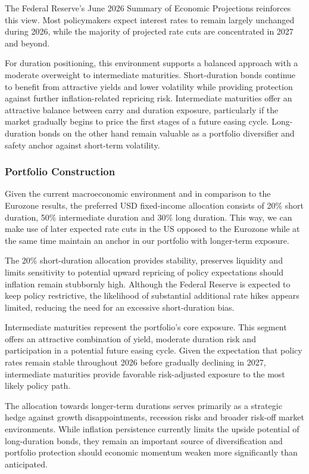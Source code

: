 \documentclass[11pt,a4paper]{article}
\begin{document}
The Federal Reserve's June 2026 Summary of Economic Projections reinforces this view. Most policymakers expect interest rates to remain largely unchanged during 2026, while the majority of projected rate cuts are concentrated in 2027 and beyond.

For duration positioning, this environment supports a balanced approach with a moderate overweight to intermediate maturities. Short-duration bonds continue to benefit from attractive yields and lower volatility while providing protection against further inflation-related repricing risk. Intermediate maturities offer an attractive balance between carry and duration exposure, particularly if the market gradually begins to price the first stages of a future easing cycle. Long-duration bonds on the other hand remain valuable as a portfolio diversifier and safety anchor against short-term volatility.

\subsubsection{Portfolio Construction}

Given the current macroeconomic environment and in comparison to the Eurozone results, the preferred USD fixed-income allocation consists of 20\% short duration, 50\% intermediate duration and 30\% long duration. This way, we can make use of later expected rate cuts in the US opposed to the Eurozone while at the same time maintain an anchor in our portfolio with longer-term exposure.

The 20\% short-duration allocation provides stability, preserves liquidity and limits sensitivity to potential upward repricing of policy expectations should inflation remain stubbornly high. Although the Federal Reserve is expected to keep policy restrictive, the likelihood of substantial additional rate hikes appears limited, reducing the need for an excessive short-duration bias.

Intermediate maturities represent the portfolio's core exposure. This segment offers an attractive combination of yield, moderate duration risk and participation in a potential future easing cycle. Given the expectation that policy rates remain stable throughout 2026 before gradually declining in 2027, intermediate maturities provide favorable risk-adjusted exposure to the most likely policy path.

The allocation towards longer-term durations serves primarily as a strategic hedge against growth disappointments, recession risks and broader risk-off market environments. While inflation persistence currently limits the upside potential of long-duration bonds, they remain an important source of diversification and portfolio protection should economic momentum weaken more significantly than anticipated.
\end{document}
